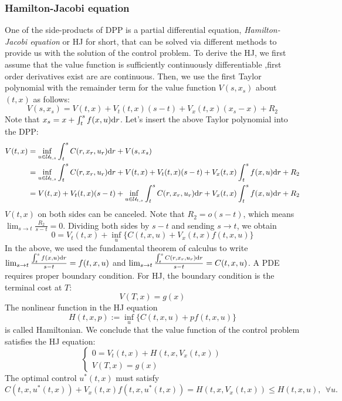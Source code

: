 \documentclass[11pt]{book}
\newcommand{\dr}{\text{\normalfont d}r}
\begin{document}
\subsubsection{Hamilton-Jacobi equation}
\label{sec:HJ}
One of the side-products of DPP is a partial differential equation, \emph{Hamilton-Jacobi equation} or HJ for short, that can be solved via different methods to provide us with the solution of the control problem. 
To derive the HJ, we first assume that the value function is sufficiently continuously differentiable ,first order derivatives exist are are continuous. Then, we use the first Taylor polynomial with the remainder term for the value function $V(s,x_s)$ about $(t,x)$ as follows:
\[
V(s,x_s) = V(t,x) + V_t(t,x)(s-t) + V_x(t,x)(x_s-x) + R_2
\]
Note that $x_s=x+\int_t^s f(x,u){{\dr}}$. Let's insert the above Taylor polynomial into the DPP:
\[
\begin{split}
    V(t,x) & =\inf_{u\in\mathcal{U}_{t,s}}\int_t^sC(r,x_r,u_r){{\dr}}+V(s,x_s)\\
    & = \inf_{u\in\mathcal{U}_{t,s}}\int_t^sC(r,x_r,u_r){{\dr}}+V(t,x) + V_t(t,x)(s-t) + V_x(t,x)\int_t^s f(x,u){{\dr}} + R_2\\
    &= V(t,x) + V_t(t,x)(s-t) +\inf_{u\in\mathcal{U}_{t,s}}\int_t^sC(r,x_r,u_r){{\dr}} + V_x(t,x)\int_t^s f(x,u){{\dr}} + R_2\\
\end{split}
\]
$V(t,x)$ on both sides can be canceled. Note that $R_2=o(s-t)$, which means $\lim_{s\to t} \frac{R_2}{s-t}=0$.
Dividing both sides by $s-t$ and sending $s\to t$, we obtain
\begin{equation}\label{eqn:HJ_deterministic}
        0 = V_t(t,x) +\inf_{u} \{C(t,x,u) + V_x(t,x)f(t,x,u)\}
\end{equation}
In the above, we used the fundamental theorem of calculus to write $\lim_{s\to t} \frac{\int_t^s f(x,u){{\dr}}}{s-t}=f(t,x,u)$ and $\lim_{s\to t} \frac{\int_t^sC(r,x_r,u_r){{\dr}}}{s-t}=C(t,x,u)$.
A PDE requires proper boundary condition. For HJ, the boundary condition is the terminal cost at $T$:
\begin{equation}
    \label{eqn:HJ_terminal}
    V(T,x)=g(x)
\end{equation}
The nonlinear function in the HJ equation
\begin{equation}
    H(t,x,p):=\inf_{u} \{C(t,x,u) + pf(t,x,u)\}
\end{equation}
is called Hamiltonian.
We conclude that the value function of the control problem satisfies the HJ equation: 
\begin{equation}
    \label{eqn:HJ_w_Hamiltonian}
    \begin{cases}
        0=V_t(t,x)+H(t,x,V_x(t,x))\\
        V(T,x)=g(x)
    \end{cases}
\end{equation}
The optimal control $u^*(t,x)$ must satisfy
\begin{equation}\label{cond:optimality_deterministic}
C(t,x,u^*(t,x)) + V_x(t,x)f(t,x,u^*(t,x)) = H(t,x,V_x(t,x))\le H(t,x,u),~~\forall u.
\end{equation}
\end{document}
